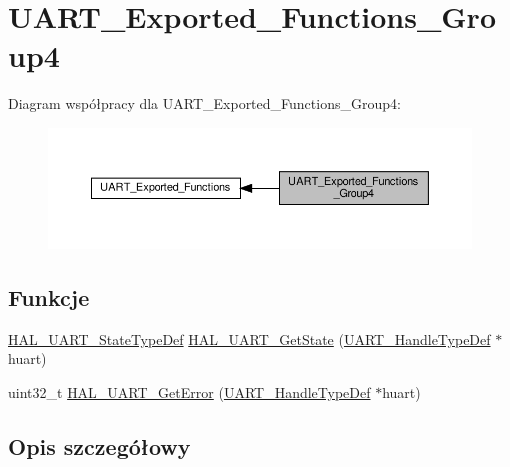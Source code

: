 \hypertarget{group___u_a_r_t___exported___functions___group4}{}\section{U\+A\+R\+T\+\_\+\+Exported\+\_\+\+Functions\+\_\+\+Group4}
\label{group___u_a_r_t___exported___functions___group4}
Diagram współpracy dla U\+A\+R\+T\+\_\+\+Exported\+\_\+\+Functions\+\_\+\+Group4\+:\nopagebreak
\begin{figure}[H]
\begin{center}
\leavevmode
\includegraphics[width=350pt]{group___u_a_r_t___exported___functions___group4}
\end{center}
\end{figure}
\subsection*{Funkcje}
\begin{DoxyCompactItemize}
\item 
\hyperlink{group___u_a_r_t___exported___types_gaf55d844a35379c204c90be5d1e8e50ba}{H\+A\+L\+\_\+\+U\+A\+R\+T\+\_\+\+State\+Type\+Def} \hyperlink{group___u_a_r_t___exported___functions___group4_ga8fcec96f9d249f41ecf0c7598ab421e5}{H\+A\+L\+\_\+\+U\+A\+R\+T\+\_\+\+Get\+State} (\hyperlink{group___u_a_r_t___exported___types_ga7adf4f3e4c3ecde572be5925c915a967}{U\+A\+R\+T\+\_\+\+Handle\+Type\+Def} $\ast$huart)
\item 
uint32\+\_\+t \hyperlink{group___u_a_r_t___exported___functions___group4_ga6c5f93a76a0bd01ad2d1351adddfa63f}{H\+A\+L\+\_\+\+U\+A\+R\+T\+\_\+\+Get\+Error} (\hyperlink{group___u_a_r_t___exported___types_ga7adf4f3e4c3ecde572be5925c915a967}{U\+A\+R\+T\+\_\+\+Handle\+Type\+Def} $\ast$huart)
\end{DoxyCompactItemize}


\subsection{Opis szczegółowy}


